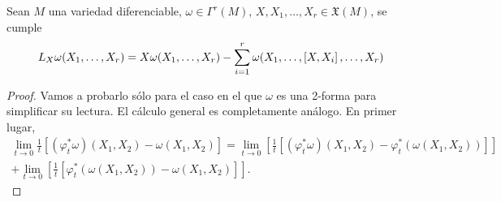 \begin{prop}
  Sean $M$ una variedad diferenciable, $\omega \in \Gamma^r(M)$, $X,X_1,\dots,X_r\in \mathfrak{X} (M)$, se cumple
  \begin{equation*}
    L_{X}\omega(X_1,\dots,X_r)=X\omega(X_1,\dots,X_r)-\sum_{i=1}^r \omega(X_1,\dots,\left[X,X_i\right],\dots,X_r)
  \end{equation*}
\end{prop}
\begin{proof}
  Vamos a probarlo sólo para el caso en el que $\omega$ es una 2-forma para simplificar su lectura. El cálculo general es completamente análogo.
  En primer lugar,
  \begin{align*}
    \lim_{t\rightarrow 0}\frac{1}{t}[(\varphi_t^* \omega)(X_1,X_2) - \omega (X_1,X_2)] =\lim_{t\rightarrow 0}\left[\frac{1}{t}[(\varphi_t^* \omega)(X_1,X_2) - \varphi_t^*(\omega(X_1,X_2))]\right] \\
    + \lim_{t\rightarrow 0}\left[\frac{1}{t}[\varphi_t^*(\omega(X_1,X_2))-\omega(X_1,X_2)]\right].
  \end{align*}


\end{proof}
